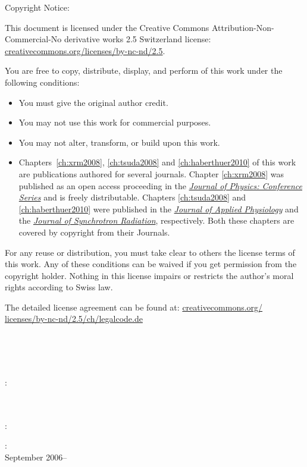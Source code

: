 \thispagestyle{empty}
\hfill
\vfill
\noindent Copyright Notice:

\noindent This document is licensed under the Creative Commons Attribution-Non-Commercial-No derivative works 2.5 Switzerland license: \href{http://creativecommons.org/licenses/by-nc-nd/2.5/ch/}{creative\-commons.org/licenses/by-nc-nd/2.5}.

\noindent You are free to copy, distribute, display, and perform of this work under the following conditions:
\begin{itemize}
	\item You must give the original author credit.
	\item You may not use this work for commercial purposes.
	\item You may not alter, transform, or build upon this work.
	\item Chapters~\ref{ch:xrm2008}, \ref{ch:tsuda2008} and \ref{ch:haberthuer2010} of this work are publications authored for several journals. Chapter \ref{ch:xrm2008} was published as an open access proceeding in the \emph{\href{http://dx.doi.org/10.1088/1742-6596/186/1/012040}{Journal of Physics: Conference Series}} and is freely distributable. Chapters \ref{ch:tsuda2008} and \ref{ch:haberthuer2010} were published in the \emph{\href{http://dx.doi.org/10.1152/japplphysiol.90546.2008}{Journal of Applied Physiology}} and the \emph{\href{http://dx.doi.org/10.1107/S0909049510019618}{Journal of Synchrotron Radiation}}, respectively. Both these chapters are covered by copyright from their Journals.
\end{itemize}
\noindent For any reuse or distribution, you must take clear to others the license terms of this work. Any of these conditions can be waived if you get permission from the copyright holder. Nothing in this license impairs or restricts the author’s moral rights according to Swiss law. 
 
\noindent The detailed license agreement can be found at: \href{http://creativecommons.org/licenses/by-nc-nd/2.5/ch/legalcode.de}{creativecommons.org/ licenses/by-nc-nd/2.5/ch/legalcode.de}
 
 \vfill

\noindent\myName\\\mbox{\emph{\myTitle}}\\\myDegree\\\myVersion
\bigskip

\noindent{}:\\
\myProf \\
\myOtherProf \\ 
\mySupervisor
\medskip

\noindent{}:\\
\noindent\myLocation
\medskip

\noindent{}:\\
September 2006--\myTime